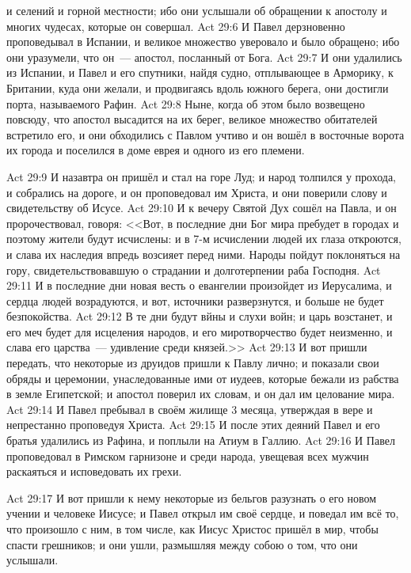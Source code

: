 и селений и горной местности;
ибо они услышали об обращении к апостолу и многих чудесах,
которые он совершал.
\vs Act 29:6
И Павел дерзновенно проповедывал в Испании,
и великое множество уверовало и было обращено;
ибо они уразумели, что он~--- апостол, посланный от Бога.
\vs Act 29:7
И они удалились из Испании, и Павел и его спутники,
найдя судно, отплывающее в Арморику, к Британии,
куда они желали, и продвигаясь вдоль южного берега,
они достигли порта, называемого Рафин. 
\vs Act 29:8
Ныне, когда об этом было возвещено повсюду,
что апостол высадится на их берег,
великое множество обитателей встретило его,
и они обходились с Павлом учтиво и он вошёл
в восточные ворота их города и поселился
в доме еврея и одного из его племени.

\vs Act 29:9
И назавтра он пришёл и стал на горе Луд;
и народ толпился у прохода, и собрались на дороге,
и он проповедовал им Христа,
и они поверили слову и свидетельству об Исусе.
\vs Act 29:10
И к вечеру Святой Дух сошёл на Павла,
и он пророчествовал, говоря:
<<Вот, в последние дни Бог мира пребудет
в городах и поэтому жители будут исчислены:
и в 7-м исчислении людей их глаза откроются,
и слава их наследия впредь возсияет перед ними.
Народы пойдут поклоняться на гору,
свидетельствовавшую о страдании
и долготерпении раба Господня. 
\vs Act 29:11
И в последние дни новая весть
о евангелии произойдет из Иерусалима,
и сердца людей возрадуются,
и вот, источники разверзнутся,
и больше не будет безпокойства.
\vs Act 29:12
В те дни будут вйны и слухи войн;
и царь возстанет, и его меч будет для исцеления народов,
и его миротворчество будет неизменно,
и слава его царства~--- удивление среди князей.>>
\vs Act 29:13
И вот пришли передать, что некоторые из друидов
пришли к Павлу лично; и показали свои обряды и церемонии,
унаследованные ими от иудеев, которые бежали из рабства
в земле Египетской; и апостол поверил их словам,
и он дал им целование мира.
\vs Act 29:14
И Павел пребывал в своём жилище 3 месяца,
утверждая в вере и непрестанно проповедуя Христа.
\vs Act 29:15
И после этих деяний Павел и его братья удалились из Рафина,
и поплыли на Атиум в Галлию.
\vs Act 29:16
И Павел проповедовал в Римском гарнизоне и среди народа,
увещевая всех мужчин раскаяться и исповедовать их грехи.

\vs Act 29:17
И вот пришли к нему некоторые из бельгов разузнать
о его новом учении и человеке Иисусе;
и Павел открыл им своё сердце, и поведал им всё то,
что произошло с ним, в том числе, как Иисус Христос
пришёл в мир, чтобы спасти грешников;
и они ушли, размышляя между собою о том,
что они услышали.

